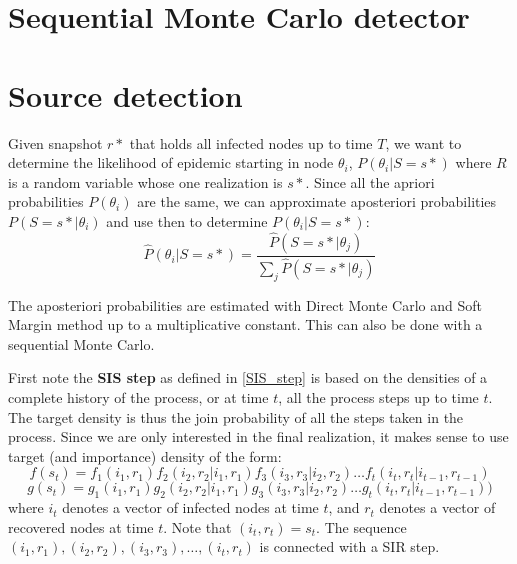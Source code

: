 \documentclass[times, utf8, diplomski]{fer}
\begin{document}
 
\section{Sequential Monte Carlo detector}

\section{Source detection}
Given snapshot $r*$ that holds all infected nodes up to time $T$, we want to determine the likelihood of epidemic starting in node $\theta_i$, $P(\theta_i | S = s*)$ where $R$ is a random variable whose one realization is $s*$.   Since all the apriori probabilities $P(\theta_i)$ are the same, we can approximate aposteriori probabilities $P(S = s* | \theta_i)$ and use then to determine $P(\theta_i | S = s*)$:
\begin{equation*}
\hat{P}(\theta_i | S = s*) = \frac{\hat{P}(S = s* | \theta_j)}{\sum_j \hat{P}(S = s* | \theta_j)}
\end{equation*}

The aposteriori probabilities are estimated with Direct Monte Carlo and Soft Margin method up to a multiplicative constant. This can also be done with a sequential Monte Carlo.

First note the \textbf{SIS step} as defined in \ref{SIS_step} is based on the densities of a complete history of the process, or at time $t$, all the process steps up to time $t$. The target density is thus the join probability of all the steps taken in the process. Since we are only interested  in the final realization, it makes sense to use target (and importance) density of the form:
\begin{equation*}
f(s_t) = f_1(i_1, r_1) f_2(i_2, r_2 | i_1, r_1)  f_3(i_3, r_3 | i_2, r_2)  \ldots  f_t(i_t, r_t | i_{t - 1}, r_{t - 1})
\end{equation*}
\begin{equation*}
g(s_t) = g_1(i_1, r_1) g_2(i_2, r_2 | i_1, r_1) g_3(i_3, r_3 | i_2, r_2) \ldots  g_t(i_t, r_t | i_{t - 1}, r_{t - 1}))
\end{equation*}
where $i_t$ denotes a vector of infected nodes at time $t$, and $r_t$ denotes a vector of recovered nodes at time $t$. Note that $(i_t, r_t) = s_t$. The sequence $(i_1, r_1), (i_2, r_2), (i_3, r_3), \ldots, (i_t, r_t)$ is connected with a SIR step.
\end{document}
